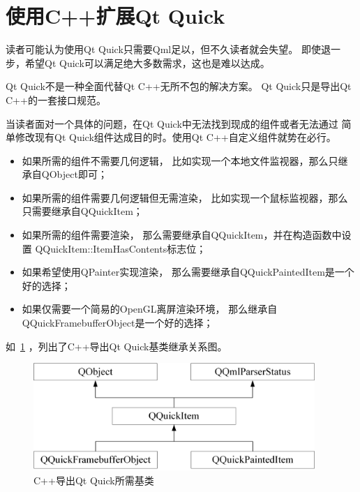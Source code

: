 ﻿




\FloatBarrier
\section{
使用C{\sourcefonttwo{}+}{\sourcefonttwo{}+}扩展Qt Quick
}\label{s100710}


读者可能认为使用Qt Quick只需要Qml足以，但不久读者就会失望。
即使退一步，希望Qt Quick可以满足绝大多数需求，这也是难以达成。

Qt Quick不是一种全面代替Qt C{\sourcefonttwo{}+}{\sourcefonttwo{}+}无所不包的解决方案。
Qt Quick只是导出Qt C{\sourcefonttwo{}+}{\sourcefonttwo{}+}的一套接口规范。

当读者面对一个具体的问题，在Qt Quick中无法找到现成的组件或者无法通过
简单修改现有Qt Quick组件达成目的时。使用Qt C{\sourcefonttwo{}+}{\sourcefonttwo{}+}自定义组件就势在必行。

\begin{itemize}

\item 如果所需的组件不需要几何逻辑，
比如实现一个本地文件监视器，那么只继承自QObject即可；

\item 如果所需的组件需要几何逻辑但无需渲染，
比如实现一个鼠标监视器，那么只需要继承自QQuickItem；

\item 如果所需的组件需要渲染，
那么需要继承自QQuickItem，并在构造函数中设置
QQuickItem::ItemHasContents标志位；

\item 如果希望使用QPainter实现渲染，
那么需要继承自QQuickPaintedItem是一个好的选择；

\item 如果仅需要一个简易的OpenGL离屏渲染环境，
那么继承自QQuickFramebufferObject是一个好的选择；

\end{itemize}

如\figurename\ \ref{p000010}
，列出了C{\sourcefonttwo{}+}{\sourcefonttwo{}+}导出Qt Quick基类继承关系图。

\begin{figure}[htb] %
\marginnote{\setlength\fboxsep{2pt}\fbox{\footnotesize{\kaishu\figurename\,}\footnotesize{\ref{p000010}}}}\centering %
\includegraphics[width=0.95\textwidth]{chapter01/images/qtquick_item.png} %
\caption{C{\sourcefonttwo{}+}{\sourcefonttwo{}+}导出Qt Quick所需基类} %
\label{p000010} %
\end{figure}


